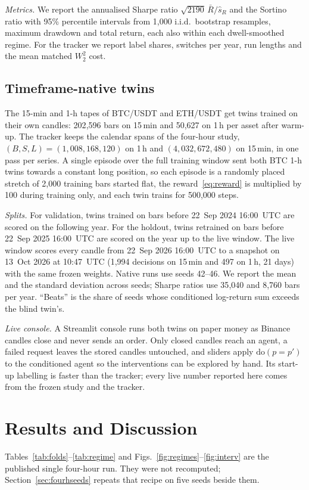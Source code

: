 \documentclass[conference]{IEEEtran}
\newcommand{\Wtwo}{W_2}
\begin{document}
\emph{Metrics.} We report the annualised Sharpe ratio $\sqrt{2190}\,\bar R/\hat s_R$ and the Sortino ratio with 95\% percentile intervals from 1{,}000 i.i.d.\ bootstrap resamples, maximum drawdown and total return, each also within each dwell-smoothed regime. For the tracker we report label shares, switches per year, run lengths and the mean matched $\Wtwo^2$ cost.

\subsection{Timeframe-native twins}
\label{sec:tfproto}
The 15-min and 1-h tapes of BTC/USDT and ETH/USDT get twins trained on their own candles: 202{,}596 bars on 15\,min and 50{,}627 on 1\,h per asset after warm-up. The tracker keeps the calendar spans of the four-hour study, $(B,S,L)=(1{,}008,168,120)$ on 1\,h and $(4{,}032,672,480)$ on 15\,min, in one pass per series. A single episode over the full training window sent both BTC 1-h twins towards a constant long position, so each episode is a randomly placed stretch of 2{,}000 training bars started flat, the reward~\eqref{eq:reward} is multiplied by 100 during training only, and each twin trains for 500{,}000 steps.

\emph{Splits.} For validation, twins trained on bars before 22~Sep 2024 16:00~UTC are scored on the following year. For the holdout, twins retrained on bars before 22~Sep 2025 16:00~UTC are scored on the year up to the live window. The live window scores every candle from 22~Sep 2026 16:00~UTC to a snapshot on 13~Oct 2026 at 10:47~UTC (1{,}994 decisions on 15\,min and 497 on 1\,h, 21 days) with the same frozen weights. Native runs use seeds 42--46. We report the mean and the standard deviation across seeds; Sharpe ratios use 35{,}040 and 8{,}760 bars per year. ``Beats'' is the share of seeds whose conditioned log-return sum exceeds the blind twin's.

\emph{Live console.} A Streamlit console runs both twins on paper money as Binance candles close and never sends an order. Only closed candles reach an agent, a failed request leaves the stored candles untouched, and sliders apply $\mathrm{do}(p{=}p')$ to the conditioned agent so the interventions can be explored by hand. Its start-up labelling is faster than the tracker; every live number reported here comes from the frozen study and the tracker.

\section{Results and Discussion}
Tables~\ref{tab:folds}--\ref{tab:regime} and Figs.~\ref{fig:regimes}--\ref{fig:interv} are the published single four-hour run. They were not recomputed; Section~\ref{sec:fourhseeds} repeats that recipe on five seeds beside them.
\end{document}
